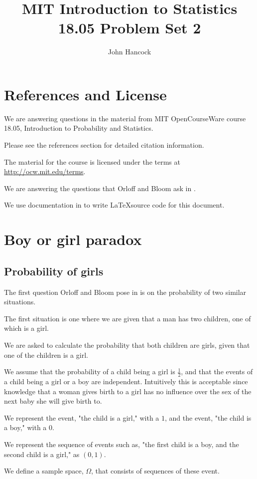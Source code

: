 \documentclass[a4paper,11pt]{article}
\author{John Hancock}
\title{MIT Introduction to Statistics 18.05 Problem Set 2 }
\begin{document}
\maketitle
\tableofcontents
\section{References and License}
We are answering questions in the material from MIT OpenCourseWare
course 18.05, Introduction to Probability and Statistics.

Please see the references section for detailed citation information.

The material for the course is licensed under the terms at 
\url{http://ocw.mit.edu/terms}.

We are answering the questions that Orloff and Bloom ask in
\cite{probSet2}.

We use documentation in  to write \LaTeX source code
for this document.

\section{Boy or girl paradox}
\subsection{Probability of girls}
The first question Orloff and Bloom pose in \cite{probSet2} is
on the probability of two similar situations.

The first situation is one where we are given that a man has
two children, one of which is a girl.

We are asked to calculate the probability that both children
are girls, given that one of the children is a girl.

We assume that the probability of a child being a girl is $\frac{1}{2}$,
and that the events of a child being a girl or a boy are independent.
Intuitively this is acceptable since knowledge that a woman gives birth
to a girl has no influence over the sex of the next baby she will give
birth to.

We represent the event, "the child is a girl," with a $1$, and
the event, "the child is a boy," with a $0$.

We represent the sequence of events such as, "the first child is  a boy, and the 
second child is a girl," as $\left( 0, 1 \right)$. 

We define a sample space, $\Omega$, that consists of sequences of these event.
\end{document}
